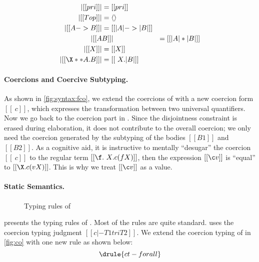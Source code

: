 \begin{definition} \label{def:type:translate:fi}
  \begin{align*}
    | [[pri]] | &= [[pri]] \\
    | [[Top]] | &= \langle \rangle \\
    | [[A -> B]]  | &= [[ | A | -> | B |  ]] \\
    | [[ A & B  ]] | &= [[ | A | * | B |  ]] \\
    | [[ X  ]] | &= [[ X ]] \\
    | [[ \X ** A . B ]] | &= [[ \ X . | B | ]]
  \end{align*}
\end{definition}


\paragraph{Coercions and Coercive Subtyping.}

As shown in \cref{fig:syntax:fco}, we extend the coercions of \tname with a new
coercion form $[[ \ c ]]$, which expresses the transformation between two
universal quantifiers. Now we go back to the coercion part in .
Since the disjointness constraint is erased during elaboration, it does not contribute to the
overall coercion; we only need the coercion generated by the subtyping of the
bodies $[[B1]]$ and $[[B2]]$. As a cognitive aid, it is instructive to mentally
``desugar'' the coercion $[[\ c]]$ to the regular term $[[ \f . \ X . c (f X)]]$, then
the expression $ [[\c v]] $ is ``equal'' to $[[  \X . c (v X) ]]$. This is why we treat
$[[ \c v ]]$ as a value.


\paragraph{\tnamee Static Semantics.}

\begin{figure}
  \centering
  \caption{Typing rules of \tnamee}
  \label{fig:typing:fco}
\end{figure}

 presents the typing rules of \tnamee. Most of the rules
are quite standard.  uses the coercion typing judgment $[[ c |- T1 tri T2 ]]$.
We extend the coercion typing of \tname in \cref{fig:co} with one new rule
 as shown below:
\[
  \drule{ct-forall}
\]


